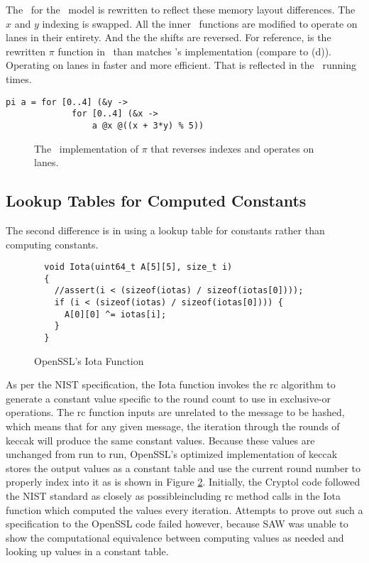 The \cryptol\ for the \fips\ model is rewritten to reflect these memory layout differences.
The $x$ and $y$ indexing is swapped.
All the inner \keccak\ functions are modified to operate on lanes in their entirety.
And the the shifts are reversed.
For reference,  is the rewritten $\pi$ function in \cryptol\ than matches \openssl's implementation (compare to (d)).
Operating on lanes in faster and more efficient.
That is reflected in the \cryptol\ running times.

\newsavebox{\PiOpenSSL}
\begin{lrbox}{\PiOpenSSL}
  \begin{lstlisting}[language=Cryptol]
    pi a = for [0..4] (&y ->
             for [0..4] (&x -> 
                 a @x @((x + 3*y) % 5))
  \end{lstlisting}
\end{lrbox}

\begin{figure}
  \begin{center}
    \usebox{\PiOpenSSL}
  \end{center}
  \caption{The \openssl\ implementation of $\pi$ that reverses indexes and operates on lanes.}
  \label{fig:piopenssl}
\end{figure}


\subsection{Lookup Tables for Computed Constants}

The second difference is in using a lookup table for constants rather than computing constants.

\lstset{style=customc, firstnumber=177}
\begin{figure}[t]
  \centering
\begin{lstlisting}
  void Iota(uint64_t A[5][5], size_t i)
  {
    //assert(i < (sizeof(iotas) / sizeof(iotas[0])));
    if (i < (sizeof(iotas) / sizeof(iotas[0]))) {
      A[0][0] ^= iotas[i];
    }
  }
\end{lstlisting}
\caption{OpenSSL's Iota Function}
\label{fig:cIota}
\end{figure}

As per the NIST specification, the Iota function invokes the rc algorithm to generate a constant value specific to the round count to use in exclusive-or operations.
The rc function inputs are unrelated to the message to be hashed, which means that for any given message, the iteration through the rounds of keccak will produce the same constant values.
Because these values are unchanged from run to run, OpenSSL's optimized implementation of keccak stores the output values as a constant table and use the current round number to properly index into it as is shown in Figure \ref{fig:cIota}. 
Initially, the Cryptol code followed the NIST standard as closely as possible\textemdash including rc method calls in the Iota function which computed the values every iteration.
Attempts to prove out such a specification to the OpenSSL code failed however, because SAW was unable to show the computational equivalence between computing values as needed and looking up values in a constant table.

